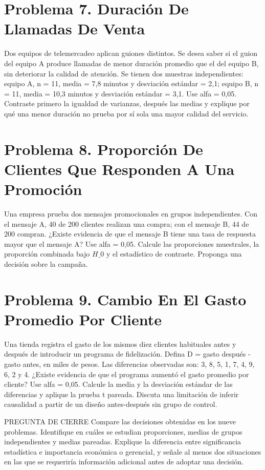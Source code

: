 \documentclass[11pt,letterpaper]{article}
\begin{document}
\section*{Problema 7. Duración De Llamadas De Venta}
Dos equipos de telemercadeo aplican guiones distintos. Se desea saber si el guion del equipo A produce llamadas de menor duración promedio que el del equipo B, sin deteriorar la calidad de atención. Se tienen dos muestras independientes: equipo A, n = 11, media = 7,8 minutos y desviación estándar = 2,1; equipo B, n = 11, media = 10,3 minutos y desviación estándar = 3,1. Use alfa = 0,05. Contraste primero la igualdad de varianzas, después las medias y explique por qué una menor duración no prueba por sí sola una mayor calidad del servicio.

\section*{Problema 8. Proporción De Clientes Que Responden A Una Promoción}
Una empresa prueba dos mensajes promocionales en grupos independientes. Con el mensaje A, 40 de 200 clientes realizan una compra; con el mensaje B, 44 de 200 compran. ¿Existe evidencia de que el mensaje B tiene una tasa de respuesta mayor que el mensaje A? Use alfa = 0,05. Calcule las proporciones muestrales, la proporción combinada bajo \(H\_0\) y el estadístico de contraste. Proponga una decisión sobre la campaña.

\section*{Problema 9. Cambio En El Gasto Promedio Por Cliente}
Una tienda registra el gasto de los mismos diez clientes habituales antes y después de introducir un programa de fidelización. Defina D = gasto después - gasto antes, en miles de pesos. Las diferencias observadas son: 3, 8, 5, 1, 7, 4, 9, 6, 2 y 4. ¿Existe evidencia de que el programa aumentó el gasto promedio por cliente? Use alfa = 0,05. Calcule la media y la desviación estándar de las diferencias y aplique la prueba t pareada. Discuta una limitación de inferir causalidad a partir de un diseño antes-después sin grupo de control.

PREGUNTA DE CIERRE
Compare las decisiones obtenidas en los nueve problemas. Identifique en cuáles se estudian proporciones, medias de grupos independientes y medias pareadas. Explique la diferencia entre significancia estadística e importancia económica o gerencial, y señale al menos dos situaciones en las que se requeriría información adicional antes de adoptar una decisión.
\end{document}
